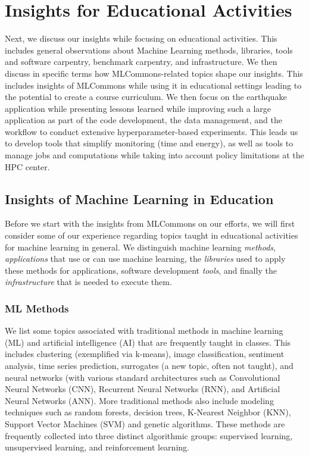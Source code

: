 \documentclass[utf8]{FrontiersinVancouver} %
\begin{document}
\section{Insights for Educational Activities}

Next, we discuss our insights while focusing on educational
activities. This includes general observations about Machine Learning
methods, libraries, tools and software carpentry, benchmark carpentry,
and infrastructure. We then discuss in specific terms how
MLCommons-related topics shape our insights. This includes insights of
MLCommons while using it in educational settings leading to the
potential to create a course curriculum. We then focus on the
earthquake application while presenting lessons learned while
improving such a large application as part of the code development,
the data management, and the workflow to conduct extensive
hyperparameter-based experiments. This leads us to develop tools that
simplify monitoring (time and energy), as well as tools to manage jobs
and computations while taking into account policy limitations at the
HPC center.

\subsection{Insights of Machine Learning in Education}
\label{sec:edu-ml}

Before we start with the insights from MLCommons on our efforts, we will first
consider some of our experience regarding topics taught in educational
activities for machine learning in general. We distinguish
machine learning {\em methods}, {\em applications} that use or can use
machine learning, the {\em libraries} used to apply these methods for
applications, software development {\em tools}, and finally the {\em
  infrastructure} that is needed to execute them.


\subsubsection{ML Methods}

We list some topics associated with traditional methods in machine
learning (ML) and artificial intelligence (AI) that are frequently
taught in classes. This includes clustering (exemplified via k-means),
image classification, sentiment analysis, time series prediction,
surrogates (a new topic, often not taught), and neural networks (with
various standard architectures such as Convolutional Neural Networks
(CNN), Recurrent Neural Networks (RNN), and Artificial Neural Networks
(ANN).  More traditional methods also include modeling techniques such
as random forests, decision trees, K-Nearest Neighbor (KNN), Support
Vector Machines (SVM) and genetic algorithms.  These methods are
frequently collected into three distinct algorithmic groups:
supervised learning, unsupervised learning, and reinforcement
learning.
\end{document}
